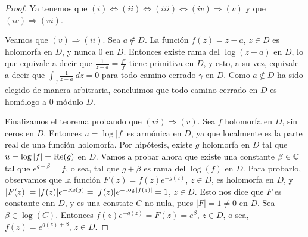 \begin{proof}
    Ya tenemos que $(i) \Longleftrightarrow (ii) \Longleftrightarrow (iii) \Longleftrightarrow (iv) \Longrightarrow (v)$ y que $(iv) \Longrightarrow (vi)$.

    Veamos que $(v) \Longrightarrow (ii)$. Sea $a \not \in D$. La función $f(z) = z-a$, $z \in D$ es holomorfa en $D$, y nunca 0 en $D$. Entonces existe rama del $\log(z-a)$ en $D$, lo que equivale a decir que $\frac{1}{z-a} = \frac{f'}{f}$ tiene primitiva en $D$, y esto, a su vez, equivale a decir que $\int_{\gamma} \frac{1}{z-a} \ dz = 0$ para todo camino cerrado $\gamma$ en $D$. Como $a \not \in D$ ha sido elegido de manera arbitraria, concluimos que todo camino cerrado en $D$ es homólogo a 0 módulo $D$.

    Finalizamos el teorema probando que $(vi) \Longrightarrow (v)$. Sea $f$ holomorfa en $D$, sin ceros en $D$. Entonces $u = \log |f|$ es armónica en $D$, ya que localmente es la parte real de una función holomorfa. Por hipótesis, existe $g$ holomorfa en $D$ tal que $u = \log|f| = \text{Re}(g)$ en $D$. Vamos a probar ahora que existe una constante $\beta \in \mathbb{C}$ tal que $e^{g + \beta} = f$, o sea, tal que $g + \beta$ es rama del $\log(f)$ en $D$. Para probarlo, observamos que la función $F(z) = f(z)e^{-g(z)}$, $z \in D$, es holomorfa en $D$, y $|F(z)| = |f(z)|e^{-\text{Re}(g)} = |f(z)|e^{-\log|f(z)|} = 1$, $z \in D$. Esto nos dice que $F$ es constante enn $D$, y es una constate $C$ no nula, pues $|F| = 1 \not = 0$ en $D$. Sea $\beta \in \log(C)$. Entonces $f(z)e^{-g(z)} = F(z) = e^{\beta}$, $z \in D$, o sea, $f(z) = e^{g(z) +\beta}$, $z \in D$.
\end{proof}